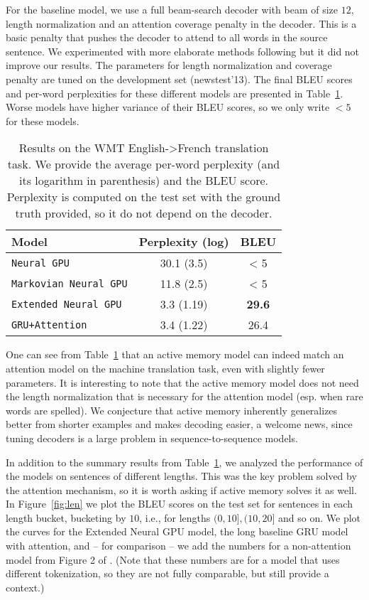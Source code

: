 \documentclass{article}
\begin{document}
For the baseline model, we use a full beam-search
decoder with beam of size $12$, length normalization and an attention
coverage penalty in the decoder. This is a basic penalty that pushes
the decoder to attend to all words in the source sentence. We experimented
with more elaborate methods following \cite{coverage} but it did not improve
our results. The parameters for length normalization
and coverage penalty are tuned on the development set (newstest'13).
The final BLEU scores and per-word perplexities for these
different models are presented in Table~\ref{tab:res}.
Worse models have higher variance of their BLEU scores,
so we only write $< 5$ for these models.

\begin{table}\begin{center}
\begin{tabular}{|l||c|c|}
\hline
{\bf Model}                    & {\bf Perplexity (log)} & {\bf BLEU} \\ \hline
\texttt{Neural GPU}            & 30.1 (3.5) & < 5 \\
\texttt{Markovian Neural GPU}  & 11.8 (2.5) & < 5 \\
\texttt{Extended Neural GPU}   & 3.3 (1.19) & \textbf{29.6} \\
\hline
\texttt{GRU+Attention}  & 3.4 (1.22) & 26.4 \\
\hline
\end{tabular}
\end{center}
\caption{Results on the WMT English->French translation task.
  We provide the average per-word perplexity (and its logarithm in parenthesis) and the BLEU score.
  Perplexity is computed on the test set with the ground truth provided,
  so it do not depend on the decoder.}
\label{tab:res}
\end{table}

One can see from Table~\ref{tab:res} that an active memory model
can indeed match an attention model on the machine translation task,
even with slightly fewer parameters. It is interesting to note that
the active memory model does not need the length normalization that
is necessary for the attention model (esp. when rare words are spelled).
We conjecture that active memory inherently generalizes better from shorter
examples and makes decoding easier, a welcome news, since tuning decoders
is a large problem in sequence-to-sequence models.

In addition to the summary results from Table~\ref{tab:res},
we analyzed the performance of the models on sentences of
different lengths. This was the key problem solved
by the attention mechanism, so it is worth asking if active memory
solves it as well.
In Figure~\ref{fig:len} we plot the BLEU scores on the test set
for sentences in each length bucket, bucketing by $10$, i.e.,
for lengths $(0, 10], (10, 20]$ and so on. We plot the curves for
the Extended Neural GPU model, the long baseline GRU model with attention,
and -- for comparison -- we add the numbers for a non-attention
model from Figure 2 of \cite{bahdanau2014neural}. (Note that
these numbers are for a model that uses different tokenization,
so they are not fully comparable, but still provide a context.)
\end{document}
